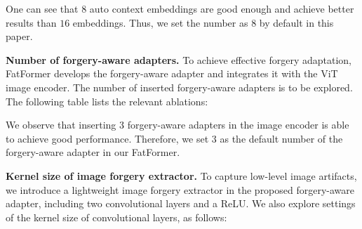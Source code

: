 \documentclass[10pt,twocolumn,letterpaper]{article}
\begin{document}
\begin{appendices}
\noindent One can see that $8$ auto context embeddings are good enough and achieve better results than $16$ embeddings. Thus, we set the number as $8$ by default in this paper. 

\noindent \textbf{Number of forgery-aware adapters.}
To achieve effective forgery adaptation, FatFormer develops the forgery-aware adapter and integrates it with the ViT image encoder. The number of inserted forgery-aware adapters is to be explored. The following table lists the relevant ablations:
\begin{table}[h]
\centering
\vspace{-3mm}
\renewcommand\arraystretch{1.0}
\vspace{-3mm}
\end{table}

\noindent We observe that inserting $3$ forgery-aware adapters in the image encoder is able to achieve good performance. Therefore, we set $3$ as the default number of the forgery-aware adapter in our FatFormer.


\noindent \textbf{Kernel size of image forgery extractor.} To capture low-level image artifacts, we introduce a lightweight image forgery extractor in the proposed forgery-aware adapter, including two convolutional layers and a ReLU. We also explore settings of the kernel size of convolutional layers, as follows:

\begin{table}[h]
\centering
\vspace{-3mm}
\renewcommand\arraystretch{1.0}
\vspace{-3mm}
\end{table}


\end{appendices}
\end{document}
